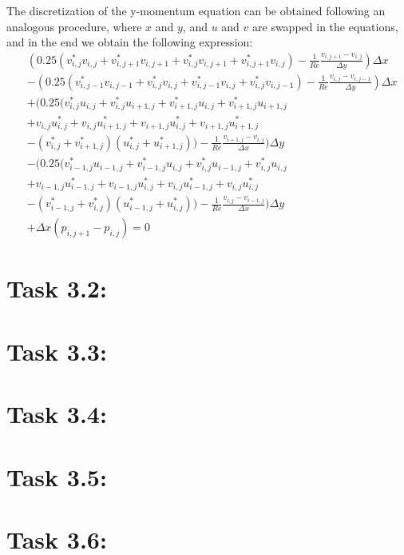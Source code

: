\documentclass{article}
\begin{document}
The discretization of the y-momentum equation can be obtained following an analogous procedure, where $x$ and $y$, and $u$ and $v$ are swapped in the equations, and in the end we obtain the following expression:
\begin{equation}
  \begin{aligned}
    & (0.25 (v^*_{i,j} v_{i,j} + v^*_{i,j+1} v_{i,j+1} + v^*_{i,j} v_{i,j+1} + v^*_{i,j+1} v_{i,j}) - \frac{1}{Re} \frac{v_{i,j+1} - v_{i,j}}{\Delta y}) \Delta x  \\
    & - (0.25 (v^*_{i,j-1} v_{i,j-1} + v^*_{i,j} v_{i,j} + v^*_{i,j-1} v_{i,j} + v^*_{i,j} v_{i,j-1}) - \frac{1}{Re} \frac{v_{i,j} - v_{i,j-1}}{\Delta y}) \Delta x \\
    & + (0.25 (v^*_{i,j}u_{i,j} + v^*_{i,j}u_{i+1,j} + v^*_{i+1,j}u_{i,j} + v^*_{i+1,j}u_{i+1,j} \\
    & + v_{i,j}u^*_{i,j} + v_{i,j}u^*_{i+1,j} + v_{i+1,j}u^*_{i,j} + v_{i+1,j}u^*_{i+1,j} \\
    & - (v^*_{i,j} + v^*_{i+1,j}) (u^*_{i,j} + u^*_{i+1,j})) - \frac{1}{Re} \frac{v_{i+1,j} - v_{i,j}}{\Delta x}) \Delta y \\
    & - (0.25 (v^*_{i-1,j}u_{i-1,j} + v^*_{i-1,j}u_{i,j} + v^*_{i,j}u_{i-1,j} + v^*_{i,j}u_{i,j} \\
    & + v_{i-1,j}u^*_{i-1,j} + v_{i-1,j}u^*_{i,j} + v_{i,j}u^*_{i-1,j} + v_{i,j}u^*_{i,j} \\
    & - (v^*_{i-1,j} + v^*_{i,j}) (u^*_{i-1,j} + u^*_{i,j})) - \frac{1}{Re} \frac{v_{i,j} - v_{i-1,j}}{\Delta x}) \Delta y \\
    & + \Delta x (p_{i,j+1} - p_{i,j}) = 0
  \end{aligned}
\end{equation}


\section*{\Large Task 3.2:}
\section*{\Large Task 3.3:}
\section*{\Large Task 3.4:}
\section*{\Large Task 3.5:}
\section*{\Large Task 3.6:}
\end{document}
